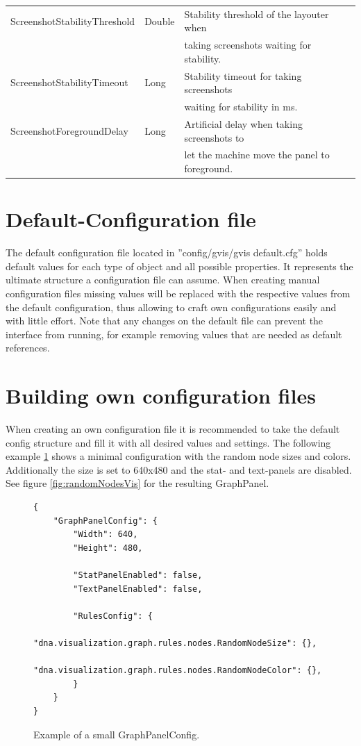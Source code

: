 \begin{table}[h]
\begin{tabular}[h]{|l|l|l|}
	\hline
	ScreenshotStabilityThreshold & Double & Stability threshold of the layouter when\\
	& & taking screenshots waiting for stability.\\
	\hline
	ScreenshotStabilityTimeout & Long & Stability timeout for taking screenshots\\
	& & waiting for stability in ms.\\
	\hline
	ScreenshotForegroundDelay & Long & Artificial delay when taking screenshots to\\
	& & let the machine move the panel to foreground.\\
	\hline
\end{tabular}
\label{tab:captureConfigValues}
\end{table}

\section{Default-Configuration file}
The default configuration file located in ”config/gvis/gvis default.cfg” holds default values for each type of object and all possible properties. It represents the ultimate structure a configuration file can assume. When creating manual configuration files missing values will be replaced with the respective values from the default configuration, thus allowing to craft own configurations easily and with little effort. Note that any changes on the default file can prevent the interface from running, for example removing values that are needed as default references.

\section{Building own configuration files}
When creating an own configuration file it is recommended to take the default config structure and fill it with all desired values and settings. The following example \ref{config:randomNodes} shows a minimal configuration with the random node sizes and colors. Additionally the size is set to 640x480 and the stat- and text-panels are disabled. See figure \ref{fig:randomNodesVis} for the resulting GraphPanel.

\begin{figure} [h]
\begin{lstlisting}
{
	"GraphPanelConfig": {
		"Width": 640, 
		"Height": 480,
	
		"StatPanelEnabled": false,
		"TextPanelEnabled": false,
	
		"RulesConfig": {	
			"dna.visualization.graph.rules.nodes.RandomNodeSize": {},
			"dna.visualization.graph.rules.nodes.RandomNodeColor": {},
		}
	}
}
\end{lstlisting}
\caption{Example of a small GraphPanelConfig.}
\label{config:randomNodes}
\end{figure}

